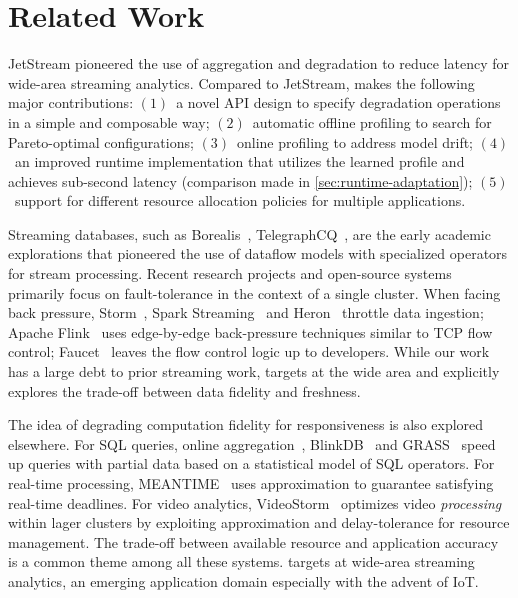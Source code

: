 \section{Related Work}
\label{sec:related-work}

 JetStream pioneered the use of aggregation and degradation to
reduce latency for wide-area streaming analytics. Compared to JetStream,
\sysname{} makes the following major contributions: $(1)$~a novel API design to
specify degradation operations in a simple and composable way; $(2)$~automatic
offline profiling to search for Pareto-optimal configurations; $(3)$~online
profiling to address model drift; $(4)$~an improved runtime implementation that
utilizes the learned profile and achieves sub-second latency (comparison made in
\autoref{sec:runtime-adaptation}); $(5)$~support for different resource
allocation policies for multiple applications.

 Streaming databases, such as
Borealis~\cite{abadi2005design},
TelegraphCQ~\cite{chandrasekaran2003telegraphcq}, are the early academic
explorations that pioneered the use of dataflow models with specialized
operators for stream processing. Recent research projects and open-source
systems~\cite{akidau2013millwheel, toshniwal2014storm, sanjeev2015twitter,
  zaharia2013discretized, carbone2015apache} primarily focus on fault-tolerance
in the context of a single cluster. When facing back pressure,
Storm~\cite{toshniwal2014storm}, Spark Streaming~\cite{zaharia2013discretized}
and Heron~\cite{sanjeev2015twitter} throttle data ingestion; Apache
Flink~\cite{carbone2015apache} uses edge-by-edge back-pressure techniques
similar to TCP flow control; Faucet~\cite{lattuada2016faucet} leaves the flow
control logic up to developers.  While our work has a large debt to prior
streaming work, \sysname{} targets at the wide area and explicitly explores the
trade-off between data fidelity and freshness.

 The idea of degrading computation fidelity for
responsiveness is also explored elsewhere. For SQL queries, online
aggregation~\cite{hellerstein1997online}, BlinkDB~\cite{agarwal2013blinkdb} and
GRASS~\cite{ananthanarayanan2014grass} speed up queries with partial data based
on a statistical model of SQL operators. For real-time processing,
MEANTIME~\cite{farrell2016meantime} uses approximation to guarantee satisfying
real-time deadlines. For video analytics, VideoStorm~\cite{zhang2017live}
optimizes video \textit{processing} within lager clusters by exploiting
approximation and delay-tolerance for resource management. The trade-off between
available resource and application accuracy is a common theme among all these
systems. \sysname{} targets at wide-area streaming analytics, an emerging
application domain especially with the advent of IoT\@.

